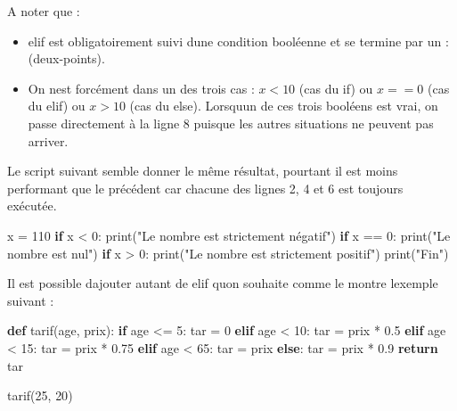 \documentclass[
  paper=a4,
  ,captions=tableheading
]{scrartcl}
\newenvironment{Shaded}{}{}
\newcommand{\BuiltInTok}[1]{\textcolor[rgb]{0.00,0.50,0.00}{#1}}
\newcommand{\ControlFlowTok}[1]{\textcolor[rgb]{0.00,0.44,0.13}{\textbf{#1}}}
\newcommand{\DecValTok}[1]{\textcolor[rgb]{0.25,0.63,0.44}{#1}}
\newcommand{\FloatTok}[1]{\textcolor[rgb]{0.25,0.63,0.44}{#1}}
\newcommand{\KeywordTok}[1]{\textcolor[rgb]{0.00,0.44,0.13}{\textbf{#1}}}
\newcommand{\NormalTok}[1]{#1}
\newcommand{\OperatorTok}[1]{\textcolor[rgb]{0.40,0.40,0.40}{#1}}
\newcommand{\StringTok}[1]{\textcolor[rgb]{0.25,0.44,0.63}{#1}}
\providecommand{\tightlist}{%
  \setlength{\itemsep}{0pt}\setlength{\parskip}{0pt}}
\begin{document}
A noter que :

\begin{itemize}
\tightlist
\item
  elif est obligatoirement suivi d\textquotesingle une condition
  booléenne et se termine par un : (deux-points).
\item
  On n\textquotesingle est forcément dans un des trois cas : \(x<10\)
  (cas du if) ou \(x==0\) (cas du elif) ou \(x>10\) (cas du else).
  Lorsqu\textquotesingle un de ces trois booléens est vrai, on passe
  directement à la ligne 8 puisque les autres situations ne peuvent pas
  arriver.
\end{itemize}

Le script suivant semble donner le même résultat, pourtant il est moins
performant que le précédent car chacune des lignes 2, 4 et 6 est
toujours exécutée.

\begin{Shaded}
\begin{Highlighting}[]
\NormalTok{x }\OperatorTok{=} \DecValTok{110}
\ControlFlowTok{if}\NormalTok{ x }\OperatorTok{\textless{}} \DecValTok{0}\NormalTok{:}
    \BuiltInTok{print}\NormalTok{(}\StringTok{"Le nombre est strictement négatif"}\NormalTok{)}
\ControlFlowTok{if}\NormalTok{ x }\OperatorTok{==} \DecValTok{0}\NormalTok{:}
    \BuiltInTok{print}\NormalTok{(}\StringTok{"Le nombre est nul"}\NormalTok{)}
\ControlFlowTok{if}\NormalTok{ x }\OperatorTok{\textgreater{}} \DecValTok{0}\NormalTok{:}
    \BuiltInTok{print}\NormalTok{(}\StringTok{"Le nombre est strictement positif"}\NormalTok{)}
\BuiltInTok{print}\NormalTok{(}\StringTok{"Fin"}\NormalTok{)}
\end{Highlighting}
\end{Shaded}

Il est possible d\textquotesingle ajouter autant de elif
qu\textquotesingle on souhaite comme le montre l\textquotesingle exemple
suivant :

\begin{Shaded}
\begin{Highlighting}[]
\KeywordTok{def}\NormalTok{ tarif(age, prix):}
    \ControlFlowTok{if}\NormalTok{ age }\OperatorTok{\textless{}=} \DecValTok{5}\NormalTok{:}
\NormalTok{        tar }\OperatorTok{=} \DecValTok{0}
    \ControlFlowTok{elif}\NormalTok{ age }\OperatorTok{\textless{}} \DecValTok{10}\NormalTok{:}
\NormalTok{        tar }\OperatorTok{=}\NormalTok{ prix }\OperatorTok{*} \FloatTok{0.5}
    \ControlFlowTok{elif}\NormalTok{ age }\OperatorTok{\textless{}} \DecValTok{15}\NormalTok{:}
\NormalTok{        tar }\OperatorTok{=}\NormalTok{ prix }\OperatorTok{*} \FloatTok{0.75}
    \ControlFlowTok{elif}\NormalTok{ age }\OperatorTok{\textless{}} \DecValTok{65}\NormalTok{:}
\NormalTok{        tar }\OperatorTok{=}\NormalTok{ prix}
    \ControlFlowTok{else}\NormalTok{:}
\NormalTok{        tar }\OperatorTok{=}\NormalTok{ prix }\OperatorTok{*} \FloatTok{0.9}
    \ControlFlowTok{return}\NormalTok{ tar}


\NormalTok{tarif(}\DecValTok{25}\NormalTok{, }\DecValTok{20}\NormalTok{)}
\end{Highlighting}
\end{Shaded}
\end{document}
